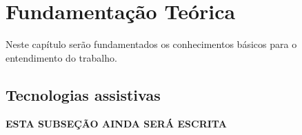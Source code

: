 \chapter{Fundamentação Teórica}
\label{ch:fundamentacao}
\par Neste capítulo ser\~ao fundamentados os conhecimentos b\'asicos para o entendimento do trabalho.

\section{Tecnologias assistivas}

\textbf{ESTA SUBSEÇÃO AINDA SERÁ ESCRITA}





